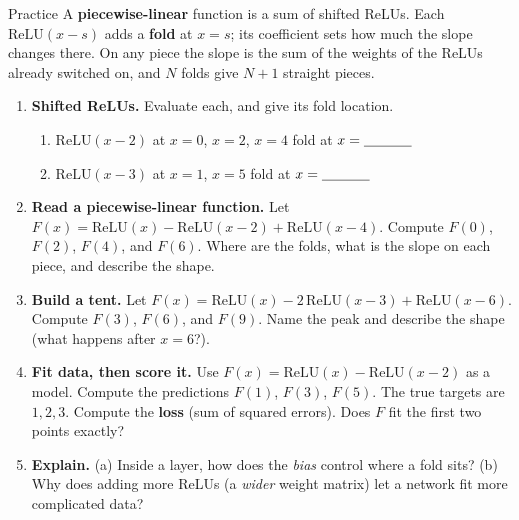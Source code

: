 \documentclass[10pt]{article}
\newcommand{\relu}{\mathrm{ReLU}}
\begin{document}
\namedateperiod

\vspace{0.12in}

\begin{notesbox}{Practice}
A \textbf{piecewise-linear} function is a sum of shifted ReLUs. Each $\relu(x-s)$ adds a \textbf{fold} at
$x=s$; its coefficient sets how much the slope changes there. On any piece the slope is the sum of the
weights of the ReLUs already switched on, and $N$ folds give $N+1$ straight pieces.

\begin{enumerate}[leftmargin=1.9em, itemsep=11pt]
  \item \textbf{Shifted ReLUs.} Evaluate each, and give its fold location.
    \begin{enumerate}[label=(\alph*), leftmargin=1.8em, itemsep=4pt]
      \item $\relu(x-2)$ at $x=0$, $x=2$, $x=4$ \hfill fold at $x=\underline{\hspace{1.2cm}}$
      \item $\relu(x-3)$ at $x=1$, $x=5$ \hfill fold at $x=\underline{\hspace{1.2cm}}$
    \end{enumerate}
    \vspace{0.7cm}
  \item \textbf{Read a piecewise-linear function.} Let $F(x)=\relu(x)-\relu(x-2)+\relu(x-4)$. Compute
        $F(0)$, $F(2)$, $F(4)$, and $F(6)$. Where are the folds, what is the slope on each piece, and
        describe the shape.
  \item \textbf{Build a tent.} Let $F(x)=\relu(x)-2\,\relu(x-3)+\relu(x-6)$. Compute $F(3)$, $F(6)$, and
        $F(9)$. Name the peak and describe the shape (what happens after $x=6$?).
  \item \textbf{Fit data, then score it.} Use $F(x)=\relu(x)-\relu(x-2)$ as a model. Compute the
        predictions $F(1)$, $F(3)$, $F(5)$. The true targets are $1,2,3$. Compute the \textbf{loss} (sum of
        squared errors). Does $F$ fit the first two points exactly? 
  \item \textbf{Explain.} (a) Inside a layer, how does the \emph{bias} control where a fold sits?
        (b) Why does adding more ReLUs (a \emph{wider} weight matrix) let a network fit more complicated
        data? 
\end{enumerate}
\end{notesbox}
\end{document}
